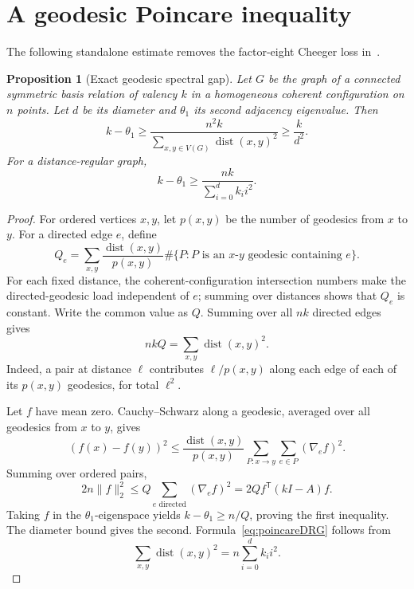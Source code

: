 \documentclass[11pt]{amsart}
\newtheorem{proposition}[theorem]{Proposition}
\theoremstyle{definition}
\newcommand{\dist}{\operatorname{dist}}
\begin{document}
\section{A geodesic Poincare inequality}\label{sec:poincare}
The following standalone estimate removes the factor-eight Cheeger loss in~\cite[Proposition 2.9]{PS}.

\begin{proposition}[Exact geodesic spectral gap]\label{prop:poincare}
Let $G$ be the graph of a connected symmetric basis relation of valency $k$ in a homogeneous coherent configuration on $n$ points.  Let $d$ be its diameter and $\theta_1$ its second adjacency eigenvalue.  Then
\begin{equation}\label{eq:poincare}
 k-\theta_1\ge
 \frac{n^2k}{\displaystyle\sum_{x,y\in V(G)}\dist(x,y)^2}
 \ge\frac{k}{d^2}.
\end{equation}
For a distance-regular graph,
\begin{equation}\label{eq:poincareDRG}
 k-\theta_1\ge\frac{nk}{\displaystyle\sum_{i=0}^{d}k_i i^2}.
\end{equation}
\end{proposition}

\begin{proof}
For ordered vertices $x,y$, let $p(x,y)$ be the number of geodesics from $x$ to $y$.  For a directed edge $e$, define
\[
 Q_e=\sum_{x,y}
 \frac{\dist(x,y)}{p(x,y)}
 \#\{P:P\text{ is an }x\text{-}y\text{ geodesic containing }e\}.
\]
For each fixed distance, the coherent-configuration intersection numbers make the directed-geodesic load independent of $e$; summing over distances shows that $Q_e$ is constant.  Write the common value as $Q$.  Summing over all $nk$ directed edges gives
\[
 nkQ=\sum_{x,y}\dist(x,y)^2.
\]
Indeed, a pair at distance $\ell$ contributes $\ell/p(x,y)$ along each edge of each of its $p(x,y)$ geodesics, for total $\ell^2$.

Let $f$ have mean zero.  Cauchy--Schwarz along a geodesic, averaged over all geodesics from $x$ to $y$, gives
\[
 (f(x)-f(y))^2
 \le\frac{\dist(x,y)}{p(x,y)}
 \sum_{P:x\to y}\sum_{e\in P}(\nabla_e f)^2.
\]
Summing over ordered pairs,
\[
 2n\lVert f\rVert_2^2
 \le Q\sum_{e\text{ directed}}(\nabla_e f)^2
 =2Q f^{\mathsf T}(kI-A)f.
\]
Taking $f$ in the $\theta_1$-eigenspace yields $k-\theta_1\ge n/Q$, proving the first inequality.  The diameter bound gives the second.  Formula~\eqref{eq:poincareDRG} follows from
\[
 \sum_{x,y}\dist(x,y)^2=n\sum_{i=0}^{d}k_i i^2.
\]
\end{proof}
\end{document}
